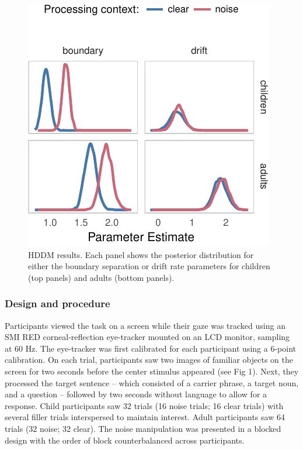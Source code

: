 \documentclass[10pt, letterpaper]{article}
\newenvironment{CodeChunk}{}{}
\begin{document}
\begin{CodeChunk}
\begin{figure}[t]

{\centering \includegraphics[width=0.8\linewidth]{figs/hddm_plot_noise-1} 

}

\caption[HDDM results]{HDDM results. Each panel shows the posterior distribution for either the boundary separation or drift rate parameters for children (top panels) and adults (bottom panels).}\label{fig:hddm_plot_noise}
\end{figure}
\end{CodeChunk}

\subsubsection{Design and procedure}\label{design-and-procedure}

Participants viewed the task on a screen while their gaze was tracked
using an SMI RED corneal-reflection eye-tracker mounted on an LCD
monitor, sampling at 60 Hz. The eye-tracker was first calibrated for
each participant using a 6-point calibration. On each trial,
participants saw two images of familiar objects on the screen for two
seconds before the center stimulus appeared (see Fig 1). Next, they
processed the target sentence -- which consisted of a carrier phrase, a
target noun, and a question -- followed by two seconds without language
to allow for a response. Child participants saw 32 trials (16 noise
trials; 16 clear trials) with several filler trials interspersed to
maintain interest. Adult participants saw 64 trials (32 noise; 32
clear). The noise manipulation was presented in a blocked design with
the order of block counterbalanced across participants.
\end{document}
